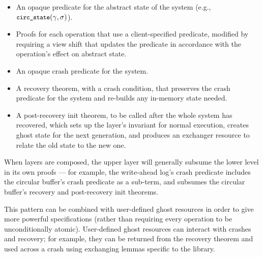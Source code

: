 \begin{itemize}
  \item An opaque predicate for the abstract state of the system (e.g.,
        $\circstate(\gamma, \sigma)$).
  \item Proofs for each operation that use a client-specified predicate,
        modified by requiring a view shift that updates the predicate in
        accordance with the operation's effect on abstract state.
  \item An opaque crash predicate for the system.
  \item A recovery theorem, with a crash condition, that preserves the crash
  predicate for the system and re-builds any in-memory state needed.
  \item A post-recovery init theorem, to be called after the whole system has
        recovered, which sets up the layer's invariant for normal execution,
        creates ghost state for the next generation, and produces an exchanger
        resource to relate the old state to the new one.
\end{itemize}

When layers are composed, the upper layer will generally subsume the lower level
in its own proofs --- for example, the write-ahead log's crash predicate
includes the circular buffer's crash predicate as a sub-term, and subsumes the
circular buffer's recovery and post-recovery init theorems.

This pattern can be combined with user-defined ghost resources in order to give
more powerful specifications (rather than requiring every operation to be
unconditionally atomic). User-defined ghost resources can interact with crashes
and recovery; for example, they can be returned from the recovery theorem and
used across a crash using exchanging lemmas specific to the library.
